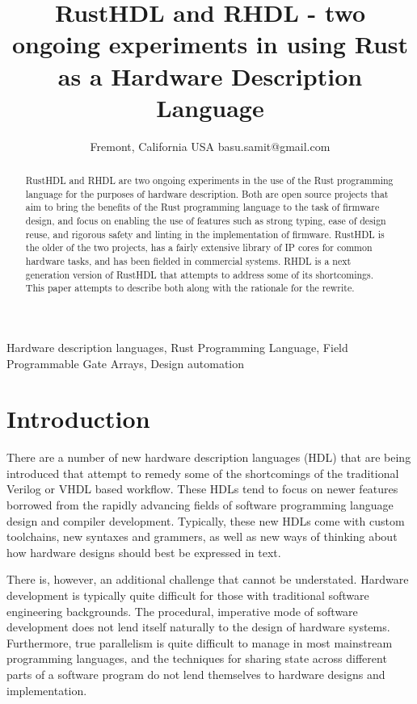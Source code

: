 \documentclass[conference]{IEEEtran}
\begin{document}
\title{RustHDL and RHDL - two ongoing experiments in using Rust as a Hardware Description Language}

\author{
  Fremont, California
  USA
  basu.samit@gmail.com
}

\maketitle

\begin{abstract}
  RustHDL and RHDL are two ongoing experiments in the use of the Rust programming language for the
  purposes of hardware description.  Both are open source projects that aim to bring the benefits
  of the Rust programming language to the task of firmware design, and focus on enabling the use
  of features such as strong typing, ease of design reuse, and rigorous safety and linting in
  the implementation of firmware.  RustHDL is the older of the two projects, has a fairly extensive
  library of IP cores for common hardware tasks, and has been fielded in commercial systems.
  RHDL is a next generation version of RustHDL that attempts to address some of its shortcomings.
  This paper attempts to describe both along with the rationale for the rewrite.
\end{abstract}

\begin{IEEEkeywords}
  Hardware description languages, Rust Programming Language, Field Programmable Gate Arrays,
  Design automation
\end{IEEEkeywords}

\section{Introduction}
There are a number of new hardware description languages (HDL) that are being introduced that
attempt to remedy some of the shortcomings of the traditional Verilog or VHDL based workflow.
These HDLs tend to focus on newer features borrowed from the rapidly advancing fields of
software programming language design and compiler development.  Typically, these new HDLs
come with custom toolchains, new syntaxes and grammers, as well as new ways of thinking about
how hardware designs should best be expressed in text.

There is, however, an additional challenge that cannot be understated.  Hardware development
is typically quite difficult for those with traditional software engineering backgrounds.
The procedural, imperative mode of software development does not lend itself naturally to
the design of hardware systems.  Furthermore, true parallelism is quite difficult to manage in
most mainstream programming languages, and the techniques for sharing state across different
parts of a software program do not lend themselves to hardware designs and implementation.
\end{document}
